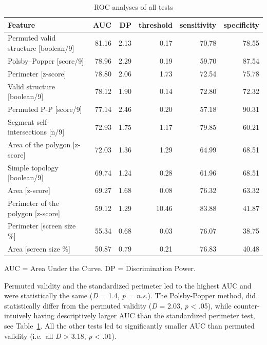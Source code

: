 \documentclass[
  man,
  floatsintext,
  longtable,
  a4paper,
  nolmodern,
  notxfonts,
  notimes,
  colorlinks=true,linkcolor=blue,citecolor=blue,urlcolor=blue]{apa7}
\begin{document}
\begin{table}

{\caption{{ROC analyses of all tests}{\label{tbl-03}}}
\vspace{-20pt}}

\fontsize{12.0pt}{14.0pt}\selectfont
\begin{tabular*}{\linewidth}{@{\extracolsep{\fill}}lrrrrr}
\toprule
Feature & AUC & DP & threshold & sensitivity & specificity \\ 
\midrule\addlinespace[2.5pt]
Permuted valid structure [boolean/9] & 81.16 & 2.13 & 0.17 & 70.78 & 78.55 \\ 
Polsby–Popper [score/9] & 78.96 & 2.29 & 0.19 & 59.70 & 87.54 \\ 
Perimeter [z-score] & 78.80 & 2.06 & 1.73 & 72.54 & 75.78 \\ 
Valid structure [boolean/9] & 78.12 & 1.90 & 0.14 & 72.80 & 72.32 \\ 
Permuted P-P [score/9] & 77.14 & 2.46 & 0.20 & 57.18 & 90.31 \\ 
Segment self-intersections [n/9] & 72.93 & 1.75 & 1.17 & 79.85 & 60.21 \\ 
Area of the polygon [z-score] & 72.03 & 1.36 & 1.29 & 64.99 & 68.51 \\ 
Simple topology [boolean/9] & 69.74 & 1.24 & 0.28 & 61.96 & 68.51 \\ 
Area [z-score] & 69.27 & 1.68 & 0.08 & 76.32 & 63.32 \\ 
Perimeter of the polygon [z-score] & 59.12 & 1.29 & 10.46 & 83.88 & 41.87 \\ 
Perimeter [screen size \%] & 55.34 & 0.68 & 0.03 & 76.07 & 38.75 \\ 
Area [screen size \%] & 50.87 & 0.79 & 0.21 & 76.83 & 40.48 \\ 
\bottomrule
\end{tabular*}
\begin{minipage}{\linewidth}
\vspace{.05em}
AUC = Area Under the Curve. DP = Discrimination Power.\\
\end{minipage}

\end{table}

Permuted validity and the standardized perimeter led to the highest AUC
and were statistically the same (\emph{D} = 1.4, \emph{p = n.s.}). The
Polsby-Popper method, did statistically differ from the permuted
validity (\emph{D} = 2.03, \emph{p} \textless{} .05), while
counter-intuively having descriptively larger AUC than the standardized
perimeter test, see Table~\ref{tbl-03}. All the other tests led to
significantly smaller AUC than permuted validity (i.e.~all \emph{D}
\textgreater{} 3.18, \emph{p} \textless{} .01).
\end{document}

